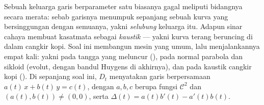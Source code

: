 \begin{problem}\label{pb:b2:curves:1}
Sebuah keluarga garis berparameter satu biasanya gagal meliputi
bidangnya secara merata: sebab garisnya menumpuk sepanjang sebuah kurva yang bersinggungan dengan
semuanya, yakni \emph{selubung} keluarga itu. Adapun sinar cahaya
membuat  kasatmata sebagai \emph{kaustik} --- yakni kurva
terang beruncing di dalam cangkir kopi. Soal ini membangun
mesin  yang umum, lalu menjalankannya empat kali: yakni pada tangga
yang meluncur (), pada normal parabola dan
sikloid (evolut, dengan bandul Huygens di akhirnya), dan pada
kaustik cangkir kopi (). Di sepanjang soal ini, $D_t$ menyatakan
garis berpersamaan $a(t)\,x + b(t)\,y = c(t)$, dengan $a, b, c$
berupa fungsi $\mathcal C^2$ dan $(a(t), b(t)) \neq (0,0)$,
serta $\Delta(t) = a(t)b'(t) - a'(t)b(t)$.


\end{problem}
